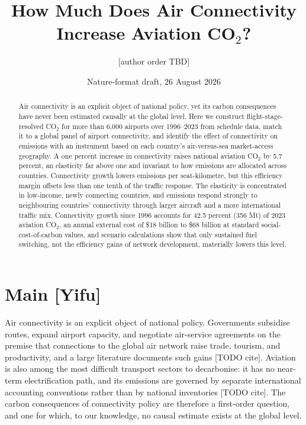 \documentclass[12pt]{article}
\title{How Much Does Air Connectivity Increase Aviation CO$_2$?}
\author{[author order TBD]}
\date{Nature-format draft, 26 August 2026}
\begin{document}
\maketitle

\begin{abstract}
\noindent Air connectivity is an explicit object of national policy, yet its
carbon consequences have never been estimated causally at the global level.
Here we construct flight-stage-resolved CO$_2$ for more than 6{,}000
airports over 1996--2023 from schedule data, match it to a global panel of
airport connectivity, and identify the effect of connectivity on emissions
with an instrument based on each country's air-versus-sea market-access
geography. A one percent increase in connectivity raises national aviation
CO$_2$ by 5.7 percent, an elasticity far above one and invariant to how
emissions are allocated across countries. Connectivity growth lowers
emissions per seat-kilometre, but this efficiency margin offsets less than
one tenth of the traffic response. The elasticity is concentrated in
low-income, newly connecting countries, and emissions respond strongly to
neighbouring countries' connectivity through larger aircraft and a more
international traffic mix. Connectivity growth since 1996 accounts for 42.5
percent (356 Mt) of 2023 aviation CO$_2$, an annual external cost of \$18
billion to \$68 billion at standard social-cost-of-carbon values, and
scenario calculations show that only sustained fuel switching, not the
efficiency gains of network development, materially lowers this level.
\end{abstract}

\section*{Main [Yifu]}
Air connectivity is an explicit object of national policy. Governments
subsidise routes, expand airport capacity, and negotiate air-service
agreements on the premise that connections to the global air network raise
trade, tourism, and productivity, and a large literature documents such
gains [TODO cite]. Aviation is also among the most difficult transport
sectors to decarbonise: it has no near-term electrification path, and its
emissions are governed by separate international accounting conventions
rather than by national inventories [TODO cite]. The carbon consequences of
connectivity policy are therefore a first-order question, and one for
which, to our knowledge, no causal estimate exists at the global level.
\end{document}
